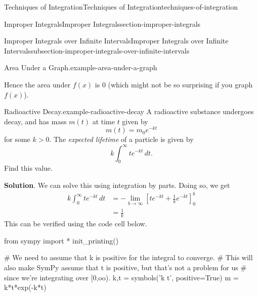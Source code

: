 \documentclass[oneside,10pt,]{book}
\numberwithin{equation}{section}
\newcommand{\gt}{>}
\begin{document}
\begin{chapterptx}{Techniques of Integration}{}{Techniques of Integration}{}{}{techniques-of-integration}
\begin{sectionptx}{Improper Integrals}{}{Improper Integrals}{}{}{section-improper-integrals}
\begin{subsectionptx}{Improper Integrals over Infinite Intervals}{}{Improper Integrals over Infinite Intervals}{}{}{subsection-improper-integrals-over-infinite-intervals}
\begin{example}{Area Under a Graph.}{example-area-under-a-graph}
%
\par
\hypertarget{p-591}{}%
Hence the area under \(f(x)\) is \(0\) (which might not be so surprising if you graph \(f(x)\)).%
\end{example}
\begin{example}{Radioactive Decay.}{example-radioactive-decay}%
\hypertarget{p-592}{}%
A radioactive substance undergoes decay, and has mass \(m(t)\) at time \(t\) given by%
\begin{equation*}
m(t) = m_{0}e^{-kt}
\end{equation*}
for some \(k\gt0\). The \emph{expected lifetime} of a particle is given by%
\begin{equation*}
k\int_{0}^{\infty}te^{-kt}\,dt.
\end{equation*}
Find this value.%
\par\smallskip%
\noindent\textbf{Solution}.\hypertarget{solution-128}{}\quad%
\hypertarget{p-593}{}%
We can solve this using integration by parts. Doing so, we get%
\begin{align*}
k\int_{0}^{\infty}te^{-kt}\,dt & = -\lim_{b\to\infty}\left[te^{-kt} + \frac{1}{k}e^{-kt}\right]_{0}^{b} \\
& = \frac{1}{k} 
\end{align*}
This can be verified using the code cell below.%
\end{example}
\begin{sageinput}
from sympy import *
init_printing()

# We need to assume that k is positive for the integral to converge.
# This will also make SymPy assume that t is positive, but that's not a problem for us
# since we're integrating over [0,oo).
k,t = symbols('k t', positive=True)
m = k*t*exp(-k*t)


\end{sageinput}
\end{subsectionptx}
\end{sectionptx}
\end{chapterptx}
\end{document}

